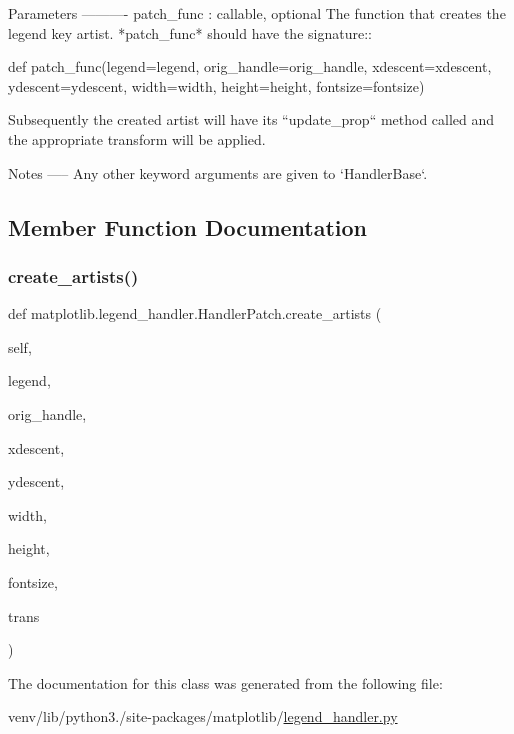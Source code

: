 \begin{DoxyVerb}Parameters
----------
patch_func : callable, optional
    The function that creates the legend key artist.
    *patch_func* should have the signature::

def patch_func(legend=legend, orig_handle=orig_handle,
               xdescent=xdescent, ydescent=ydescent,
               width=width, height=height, fontsize=fontsize)

    Subsequently the created artist will have its ``update_prop``
    method called and the appropriate transform will be applied.

Notes
-----
Any other keyword arguments are given to `HandlerBase`.
\end{DoxyVerb}
 

\subsection{Member Function Documentation}
\mbox{\label{classmatplotlib_1_1legend__handler_1_1HandlerPatch_a0625912a125911ebccebb1c0f5d769bd}} 
\subsubsection{\texorpdfstring{create\+\_\+artists()}{create\_artists()}}
{\footnotesize\ttfamily def matplotlib.\+legend\+\_\+handler.\+Handler\+Patch.\+create\+\_\+artists (\begin{DoxyParamCaption}\item[{}]{self,  }\item[{}]{legend,  }\item[{}]{orig\+\_\+handle,  }\item[{}]{xdescent,  }\item[{}]{ydescent,  }\item[{}]{width,  }\item[{}]{height,  }\item[{}]{fontsize,  }\item[{}]{trans }\end{DoxyParamCaption})}



The documentation for this class was generated from the following file\+:\begin{DoxyCompactItemize}
\item 
venv/lib/python3./site-\/packages/matplotlib/\hyperlink{legend__handler_8py}{legend\+\_\+handler.\+py}\end{DoxyCompactItemize}
